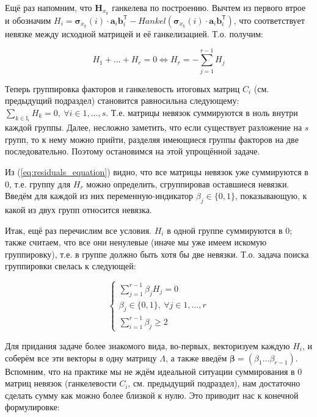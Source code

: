 	    	Ещё раз напомним, что $ \mathbf{H}_{x_k} $ ганкелева по построению. Вычтем из первого втрое и обозначим $ H_i = \boldsymbol{\sigma}_{x_k}(i) \cdot \mathbf{a}_i  \mathbf{b}_i^{\mathsf{T}} - Hankel(\boldsymbol{\sigma}_{x_k}(i) \cdot \mathbf{a}_i  \mathbf{b}_i^{\mathsf{T}}) $, что соответствует невязке между исходной матрицей и её ганкелизацией. Т.о. получим:
	    	
	    	\begin{equation}\label{eq:residuals_equation}
	    		H_1 + \ldots + H_r = 0 \Leftrightarrow H_r = - \sum\limits_{j = 1}^{r - 1} H_j
	    	\end{equation}
	    	
	    	Теперь группировка факторов и ганкелевость итоговых матриц $ C_i $ (см. предыдущий подраздел) становится равносильна следующему: $ \sum_{k \in \mathbb{I}_i} H_k = 0, \  \forall i \in 1, \ldots, s $. Т.е. матрицы невязок суммируются в ноль внутри каждой группы. Далее, несложно заметить, что если существует разложение на $ s $ групп, то к нему можно прийти, разделяя имеющиеся группы факторов на две последовательно. Поэтому остановимся на этой упрощённой задаче.
	    	
	    	Из (\ref{eq:residuals_equation}) видно, что все матрицы невязок уже суммируются в $ 0 $, т.е. группу для $ H_r $ можно определить, сгруппировав оставшиеся невязки. Введём для каждой из них переменную-индикатор $ \beta_j \in \{0, 1\} $, показывающую, к какой из двух групп относится невязка. 
	    	
	    	Итак, ещё раз перечислим все условия. $ H_i $ в одной группе суммируются в $ 0 $; также считаем, что все они ненулевые (иначе мы уже имеем искомую группировку), т.е. в группе должно быть хотя бы две невязки. Т.о. задача поиска группировки свелась к следующей:
	    	
	    	\begin{equation}
	    		\begin{cases*}
	    			\sum\limits_{j = 1}^{r - 1} \beta_j H_j = 0 \\
	    			\beta_j \in \{0, 1\}, \ \forall j \in 1, \ldots, r \\
	    			\sum\limits_{i = 1}^{r - 1} \beta_j \ge 2
	    		\end{cases*}
	    	\end{equation}
	    	
	    	Для придания задаче более знакомого вида, во-первых, векторизуем каждую $ H_i $, и соберём все эти векторы в одну матрицу $ \Lambda $, а также введём $ \boldsymbol{\beta} = (\beta_1 \ldots \beta_{r-1}) $. Вспомним, что на практике мы не ждём идеальной ситуации суммирования в $ 0 $ матриц невязок (ганкелевости $ C_i $, см. предыдущий подраздел), нам достаточно сделать сумму как можно более близкой к нулю. Это приводит нас к конечной формулировке:
	    	

